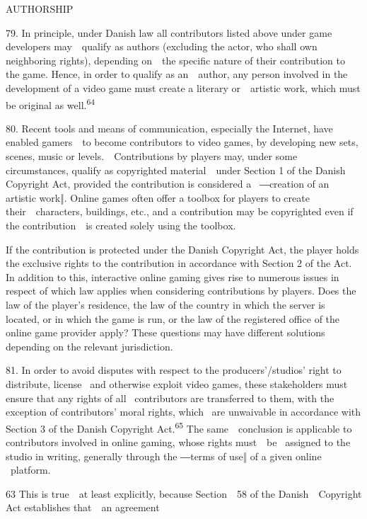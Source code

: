 \documentclass[
]{article}
\begin{document}
{AUTHORSHIP}

{79. }{In principle, under Danish law all contributors listed above
under }{game developers }{may~~qualify as authors (excluding the actor,
who shall own neighboring rights), depending on~~the specific nature of
their contribution to the game. Hence, in order to qualify as
an~~author, any person involved in the development of a video game must
}{create }{a literary or~~artistic work, which must be original as
well.}\textsuperscript{{64}}

{80. }{Recent tools and means of communication, especially the Internet,
have enabled gamers~~to become contributors to video games, by
developing new sets, scenes, music or levels.~~Contributions by players
may, under some circumstances, qualify as copyrighted material~~under
Section 1 of the Danish }{Copyright Act}{, provided the contribution is
considered a }{~―}{creation of an artistic work}{‖}{. Online games often
offer a toolbox for players to create their~~characters, buildings,
etc., and a contribution may be copyrighted even if the contribution~~is
created solely using the toolbox.}

{If the contribution is protected under the Danish }{Copyright Act}{,
the player holds the exclusive rights to the contribution in accordance
with Section 2 of the Act. In addition to this, interactive online
gaming gives rise to numerous issues in respect of which law applies
when considering contributions by players. }{Does the law of the
player's }{residence, the law of the country in which the server is
located, or in which the game is run, or the law of the registered
office of the online game provider apply? These questions may have
different solutions depending on the relevant jurisdiction.}

{81. }{In order to avoid disputes with respect to the
producers'/studios' right to distribute, license }{~and otherwise
exploit video games, these stakeholders must ensure that any rights of
all }{~contributors are transferred to them, with the exception of
contributors' moral rights, which }{~are unwaivable in accordance with
Section 3 of the Danish }{Copyright Act.}\textsuperscript{{65 }}{The
same~~conclusion is applicable to contributors involved in online
gaming, whose rights must~~be }{~assigned to the studio in writing,
generally through the ―terms of use‖ of a given online }{~platform.}

{63 }{This is true~~at least explicitly, because Section~~58 of the
Danish~~}{Copyright Act }{establishes that~~an agreement}
\end{document}
